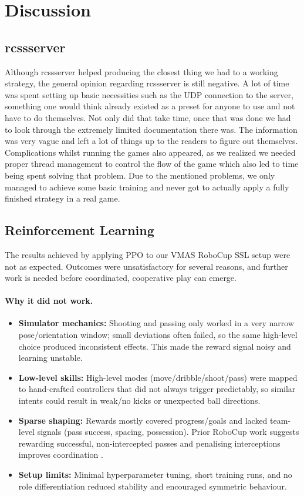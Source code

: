\section{Discussion}
\label{section:disc}

\subsection{rcssserver}
Although rcssserver helped producing the closest thing we had to a working strategy, the general opinion regarding rcssserver is still negative. A lot of time was spent setting up basic necessities such as the UDP connection to the server, something one would think already existed as a preset for anyone to use and not have to do themselves. Not only did that take time, once that was done we had to look through the extremely limited documentation there was. The information was very vague and left a lot of things up to the readers to figure out themselves. Complications whilst running the games also appeared, as we realized we needed proper thread management to control the flow of the game which also led to time being spent solving that problem. Due to the mentioned problems, we only managed to achieve some basic training and never got to actually apply a fully finished strategy in a real game.

\subsection{Reinforcement Learning}
The results achieved by applying PPO to our VMAS RoboCup SSL setup were not as expected. Outcomes were unsatisfactory for several reasons, and further work is needed before coordinated, cooperative play can emerge.

\paragraph{Why it did not work.}
\begin{itemize}
  \item \textbf{Simulator mechanics:} Shooting and passing only worked in a very narrow pose/orientation window; small deviations often failed, so the same high-level choice produced inconsistent effects. This made the reward signal noisy and learning unstable.
  \item \textbf{Low-level skills:} High-level modes (move/dribble/shoot/pass) were mapped to hand-crafted controllers that did not always trigger predictably, so similar intents could result in weak/no kicks or unexpected ball directions.
  \item \textbf{Sparse shaping:} Rewards mostly covered progress/goals and lacked team-level signals (pass success, spacing, possession). Prior RoboCup work suggests rewarding successful, non-intercepted passes and penalising interceptions improves coordination \cite{SRC2018Team}.
  \item \textbf{Setup limits:} Minimal hyperparameter tuning, short training runs, and no role differentiation reduced stability and encouraged symmetric behaviour.
\end{itemize}

